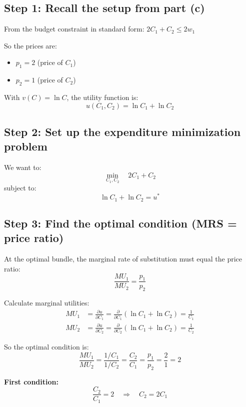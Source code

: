 \documentclass[12pt]{article}
\begin{document}
\subsection*{Step 1: Recall the setup from part (c)}

From the budget constraint in standard form: $2C_1 + C_2 \leq 2w_1$

So the prices are:
\begin{itemize}
\item $p_1 = 2$ (price of $C_1$)
\item $p_2 = 1$ (price of $C_2$)
\end{itemize}

With $v(C) = \ln C$, the utility function is:
\[u(C_1, C_2) = \ln C_1 + \ln C_2\]

\subsection*{Step 2: Set up the expenditure minimization problem}

\begin{tcolorbox}[colback=yellow!10!white,colframe=orange!75!black]
We want to:
\[\min_{C_1, C_2} \quad 2C_1 + C_2\]
subject to:
\[\ln C_1 + \ln C_2 = u^*\]
\end{tcolorbox}

\subsection*{Step 3: Find the optimal condition (MRS = price ratio)}

At the optimal bundle, the marginal rate of substitution must equal the price ratio:
\[\frac{MU_1}{MU_2} = \frac{p_1}{p_2}\]

Calculate marginal utilities:
\begin{align*}
MU_1 &= \frac{\partial u}{\partial C_1} = \frac{\partial}{\partial C_1}(\ln C_1 + \ln C_2) = \frac{1}{C_1} \\
MU_2 &= \frac{\partial u}{\partial C_2} = \frac{\partial}{\partial C_2}(\ln C_1 + \ln C_2) = \frac{1}{C_2}
\end{align*}

So the optimal condition is:
\[\frac{MU_1}{MU_2} = \frac{1/C_1}{1/C_2} = \frac{C_2}{C_1} = \frac{p_1}{p_2} = \frac{2}{1} = 2\]

\begin{tcolorbox}[colback=green!10!white,colframe=green!75!black]
\textbf{First condition:}
\[\frac{C_2}{C_1} = 2 \quad \Rightarrow \quad \boxed{C_2 = 2C_1}\]
\end{tcolorbox}
\end{document}
